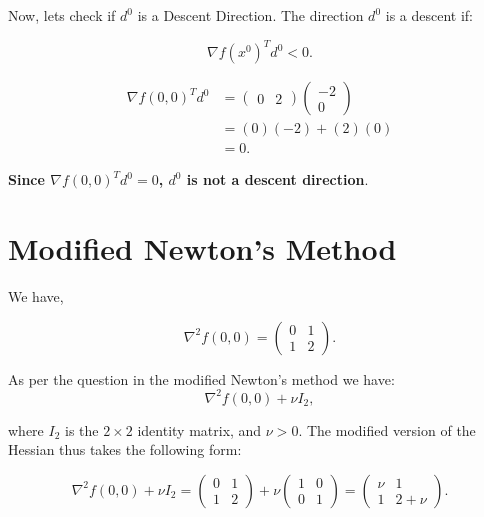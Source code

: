 \documentclass{article}
\begin{document}
 Now, lets check if \( d^0 \) is a Descent Direction. The direction \( d^0 \) is a descent if:

\begin{equation}
\nabla f(x^0)^T d^0 < 0.
\end{equation}

\begin{align*}
\nabla f(0,0)^T d^0 &= 
\begin{pmatrix}
0 & 2
\end{pmatrix}
\begin{pmatrix}
-2 \\
0
\end{pmatrix} \\
&= (0)(-2) + (2)(0) \\
&= 0.
\end{align*}

\textbf{Since \( \nabla f(0,0)^T d^0 = 0 \),  \( d^0 \) is not a descent direction}.

\newpage


\section{Modified Newton’s Method}
We have,

\begin{equation}
\nabla^2 f(0,0) =
\begin{pmatrix}
0 & 1 \\
1 & 2
\end{pmatrix}.
\end{equation}

As per the question in the modified Newton's method we have:
\begin{equation}
\nabla^2 f(0,0) + \nu I_2,
\end{equation}

where \( I_2 \) is the \( 2 \times 2 \) identity matrix, and \( \nu > 0 \). The modified version of the Hessian thus takes the following form: 

\begin{equation}
\nabla^2 f(0,0) + \nu I_2 =
\begin{pmatrix}
0 & 1 \\
1 & 2
\end{pmatrix}
+ \nu 
\begin{pmatrix}
1 & 0 \\
0 & 1
\end{pmatrix}
=
\begin{pmatrix}
\nu & 1 \\
1 & 2 + \nu
\end{pmatrix}.
\end{equation}
\end{document}

